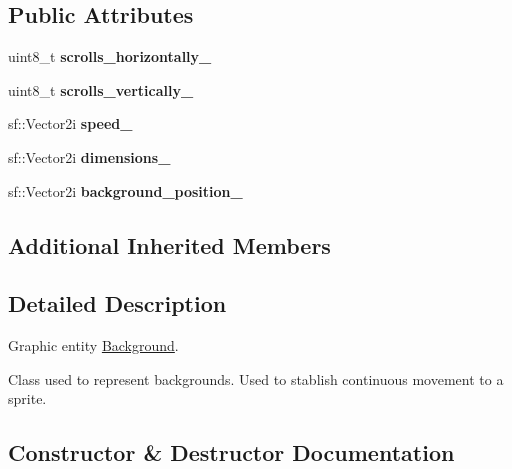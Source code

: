 \subsection*{Public Attributes}
\begin{DoxyCompactItemize}
\item 
\mbox{\label{class_background_a9150d8924dc8e74ff9852d33cc0b574f}} 
uint8\+\_\+t {\bfseries scrolls\+\_\+horizontally\+\_\+}
\item 
\mbox{\label{class_background_aa26c61f1bbed1d8a8625b51bc3cc16dd}} 
uint8\+\_\+t {\bfseries scrolls\+\_\+vertically\+\_\+}
\item 
\mbox{\label{class_background_a4402837678f3b72ac1f5803c97dfba28}} 
sf\+::\+Vector2i {\bfseries speed\+\_\+}
\item 
\mbox{\label{class_background_a515f93f6c513ec0519c02fa30c8bc5fa}} 
sf\+::\+Vector2i {\bfseries dimensions\+\_\+}
\item 
\mbox{\label{class_background_abf90fe1fcc93375f86aee37a1dddbe37}} 
sf\+::\+Vector2i {\bfseries background\+\_\+position\+\_\+}
\end{DoxyCompactItemize}
\subsection*{Additional Inherited Members}


\subsection{Detailed Description}
Graphic entity \hyperlink{class_background}{Background}. 

Class used to represent backgrounds. Used to stablish continuous movement to a sprite. 

\subsection{Constructor \& Destructor Documentation}
\mbox{\label{class_background_a8e03d13cc66a276ebd4ec1e6fc9e8c98}} 

